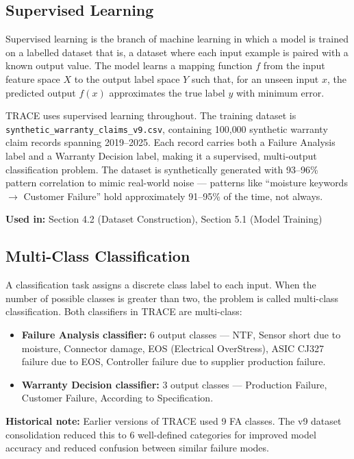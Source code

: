 \documentclass[10pt]{article}
\begin{document}
\subsection{Supervised Learning}

Supervised learning is the branch of machine learning in which a model is trained on a labelled dataset that is, a dataset where each input example is paired with a known output value. The model learns a mapping function \(f\) from the input feature space \(X\) to the output label space \(Y\) such that, for an unseen input \(x\), the predicted output \(f(x)\) approximates the true label \(y\) with minimum error.

TRACE uses supervised learning throughout. The training dataset is \texttt{synthetic\_warranty\_claims\_v9.csv}, containing 100{,}000 synthetic warranty claim records spanning 2019--2025. Each record carries both a Failure Analysis label and a Warranty Decision label, making it a supervised, multi-output classification problem. The dataset is synthetically generated with 93--96\% pattern correlation to mimic real-world noise --- patterns like ``moisture keywords $\rightarrow$ Customer Failure'' hold approximately 91--95\% of the time, not always.

\textbf{Used in:} Section 4.2 (Dataset Construction), Section 5.1 (Model Training)

\subsection{Multi-Class Classification}

A classification task assigns a discrete class label to each input. When the number of possible classes is greater than two, the problem is called multi-class classification. Both classifiers in TRACE are multi-class:

\begin{itemize}
    \item \textbf{Failure Analysis classifier:} 6 output classes --- NTF, Sensor short due to moisture, Connector damage, EOS (Electrical OverStress), ASIC CJ327 failure due to EOS, Controller failure due to supplier production failure.
    \item \textbf{Warranty Decision classifier:} 3 output classes --- Production Failure, Customer Failure, According to Specification.
\end{itemize}

\textbf{Historical note:} Earlier versions of TRACE used 9 FA classes. The v9 dataset consolidation reduced this to 6 well-defined categories for improved model accuracy and reduced confusion between similar failure modes.
\end{document}
